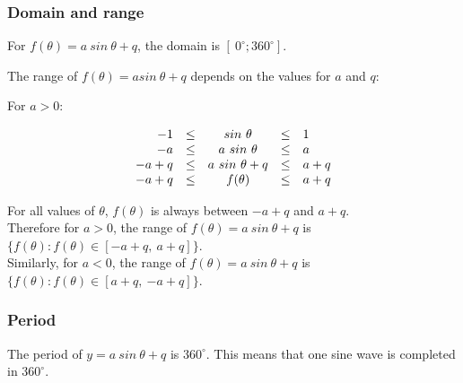 \subsubsection*{Domain and range}
\nopagebreak
For $f(\theta) = a~sin~\theta + q$, the domain is $[~0^{\circ}; 360^{\circ}]$. \par
The range of $f(\theta )=asin~\theta +q$ depends on the values for $a$ and $q$:\par 
For $a>0$:\par 
\nopagebreak\noindent{}
\begin{equation*}
  \begin{array}{rcccl}
    \hfill   -1 & \leq &  sin~\theta     & \leq & 1   \hfill \\
    \hfill   -a & \leq & a~sin~\theta     & \leq & a   \hfill \\
    \hfill -a+q & \leq & a~sin~\theta + q & \leq & a+q \hfill \\
    \hfill -a+q & \leq &  f(\theta)      & \leq & a+q \hfill 
  \end{array}
\end{equation*}
\par
For all values of $\theta$, $f(\theta)$ is always between $-a+q$ and
$a+q$.\\

Therefore for $a>0$, the range of $f(\theta )=a~sin~\theta +q$ is
$\{f(\theta ):f(\theta )\in [-a+q,~a+q]\}$.\\

Similarly, for $a<0$, the range of $f(\theta )=a~sin~\theta +q$ is
$\{f(\theta ):f(\theta )\in [a+q,~{-a}+q]\}$.



\subsubsection*{Period}
The period of $y=a~sin~\theta+q$ is $360^{\circ}$. This means that one sine wave is completed in $360^{\circ}$. 

